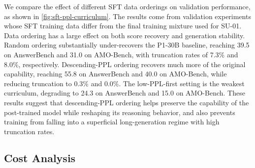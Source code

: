 \documentclass{llmxive}
\begin{document}
 We compare the effect of different SFT data orderings on validation performance, as shown in \cref{fig:sft-ppl-curriculum}. The results come from validation
  experiments whose SFT training data differ from the final training mixture used for SU-01. Data ordering has a large effect on both score recovery and generation
  stability. Random ordering substantially under-recovers the P1-30B baseline, reaching 39.5 on AnswerBench and 31.0 on AMO-Bench, with truncation rates of 7.3\%
  and 8.0\%, respectively. Descending-PPL ordering recovers much more of the original capability, reaching 55.8 on AnswerBench and 40.0 on AMO-Bench, while reducing
  truncation to 0.3\% and 0.0\%. The low-PPL-first setting is the weakest curriculum, degrading to 24.3 on AnswerBench and 15.0 on AMO-Bench. These results suggest
  that descending-PPL ordering helps preserve the capability of the post-trained model while reshaping its reasoning behavior, and also prevents training from
  falling into a superficial long-generation regime with high truncation rates.


\subsection{Cost Analysis}
\label{sec:cost_analysis}




\end{document}
